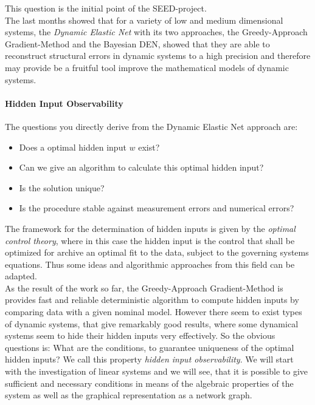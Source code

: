 This question is the initial point of the 
SEED-project. \\

The last months showed that for a variety of low and medium dimensional systems, the \textit{Dynamic Elastic Net} 
with its two approaches, the \textsf{Greedy-Approach Gradient-Method} and the \textsf{Bayesian DEN}, showed 
that they are able to reconstruct structural errors in dynamic systems to a high precision and therefore may 
provide be a fruitful tool improve the mathematical models of dynamic systems.

\paragraph*{Hidden Input Observability}
The questions you directly derive from the Dynamic Elastic Net approach are:
\begin{itemize}
	\item Does a optimal hidden input $w$ exist?
	\item Can we give an algorithm to calculate this optimal hidden input?
	\item Is the solution unique?
	\item Is the procedure stable against measurement errors and numerical errors?
\end{itemize}

The framework for the determination of hidden inputs is given by the \textit{optimal control theory}, where in 
this case the hidden input is the control that shall be optimized for archive an optimal fit to the data, 
subject to the governing systems equations. Thus some ideas and algorithmic approaches from this field can 
be adapted. \\

As the result of the work so far, the \textsf{Greedy-Approach Gradient-Method} is provides fast and reliable
deterministic algorithm to compute hidden inputs by comparing data with a given nominal model. However there 
seem to exist types of dynamic systems, that give remarkably good results, where some dynamical systems seem to 
hide their hidden inputs very effectively. So the obvious questions is: What are the conditions, to guarantee 
uniqueness of the optimal hidden inputs? We call this property \textit{hidden input observability}. We will 
start with the investigation of linear systems and we will see, that it is possible to give sufficient and 
necessary conditions in means of the algebraic properties of the system as well as the graphical representation 
as a network graph. \\

